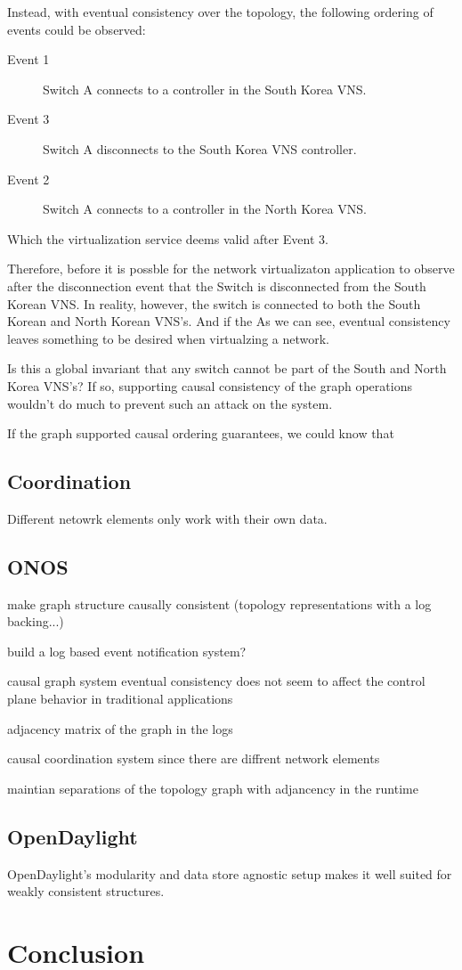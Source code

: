 \documentclass[letterpaper,twocolumn,10pt]{article}
\begin{document}
Instead, with eventual consistency over the topology, the following ordering of events could be observed:

\begin{description}
\item [Event 1] Switch A connects to a controller in the South Korea VNS.
\item [Event 3] Switch A disconnects to the South Korea VNS controller.
\item [Event 2] Switch A connects to a controller in the North Korea VNS.
\end{description}

Which the virtualization service deems valid after Event 3.

Therefore, before it is possble for the network virtualizaton application to observe after the disconnection event that the Switch is disconnected from the South Korean VNS. In reality, however, the switch is connected to both the South Korean and North Korean VNS's. And if the 
As we can see, eventual consistency leaves something to be desired when virtualzing a network.

Is this a global invariant that any switch cannot be part of the South and North Korea VNS's? If so, supporting causal consistency of the graph operations wouldn't do much to prevent such an attack on the system.

If the graph supported causal ordering guarantees, we could know that 


\subsection{Coordination}

Different netowrk elements only work with their own data.

\subsection{ONOS}

make graph structure causally consistent (topology representations with a log backing...)

build a log based event notification system?

causal graph system
    eventual consistency does not seem to affect the control plane behavior in traditional applications

adjacency matrix of the graph in the logs

causal coordination system since there are diffrent network elements

maintian separations of the topology graph with adjancency in the runtime
\subsection{OpenDaylight}

OpenDaylight's modularity and data store agnostic setup makes it well suited for weakly consistent structures.

\section{Conclusion}



\end{document}
